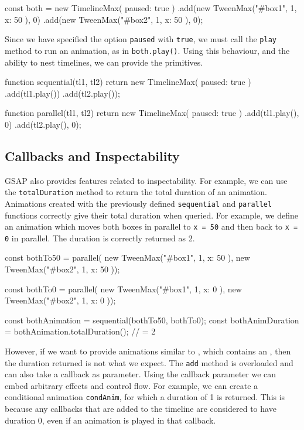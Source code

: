 \begin{js}
const both = new TimelineMax({ paused: true })
  .add(new TweenMax("#box1", 1, { x: 50 }), 0)
  .add(new TweenMax("#box2", 1, { x: 50 }), 0);
\end{js}

Since we have specified the option \texttt{paused} with \texttt{true}, we must
call the \texttt{play} method to run an animation, as in
\texttt{both.play()}. Using this behaviour, and the ability to nest timelines,
we can provide the \dsl{} primitives.

\begin{js}
function sequential(tl1, tl2) {
  return new TimelineMax({ paused: true })
    .add(tl1.play())
    .add(tl2.play()); }

function parallel(tl1, tl2) {
  return new TimelineMax({ paused: true })
    .add(tl1.play(), 0)
    .add(tl2.play(), 0); }
\end{js}

\subsection{Callbacks and Inspectability}

GSAP also provides features related to inspectability. For example, we can use the
\texttt{totalDuration} method to return the total duration of an animation.
Animations created with the previously defined \texttt{sequential} and
\texttt{parallel} functions correctly give their total duration when queried.
For example, we define an animation which moves both boxes in parallel to
\texttt{x = 50} and then back to \texttt{x = 0} in parallel. The duration is
correctly returned as 2.

\begin{js}
const bothTo50 = parallel(
  new TweenMax("#box1", 1, { x: 50 }),
  new TweenMax("#box2", 1, { x: 50 }));

const bothTo0 = parallel(
  new TweenMax("#box1", 1, { x: 0 }),
  new TweenMax("#box2", 1, { x: 0 }));

const bothAnimation = sequential(bothTo50, bothTo0);
const bothAnimDuration = bothAnimation.totalDuration(); // = 2
\end{js}

However, if we want to provide animations similar to , which contains an , then the duration returned is not what we expect. The \texttt{add} method is overloaded and can also take a callback as parameter. Using the callback parameter we can embed arbitrary effects and control flow. For example, we can create a conditional animation \texttt{condAnim}, for which a duration of 1 is returned. This is because any callbacks that are added to the timeline are considered to have duration 0, even if an animation is played in that callback.

